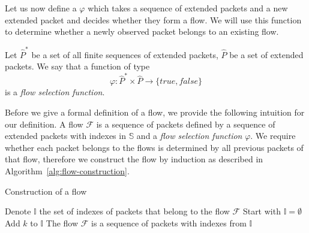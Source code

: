 Let us now define a \emph{} $\varphi$ which takes a sequence of extended packets and a new extended packet and decides whether they form a flow. We will use this function to determine whether a newly observed packet belongs to an existing flow.
\begin{defn}\label{def:flow-selection-function}
Let $\widehat{P}^*$ be a set of all finite sequences of extended packets, $\widehat{P}$ be a set of extended packets. We say that a function of type
\begin{equation*}
 	\varphi: \widehat{P}^*\times \widehat{P} \to \{true,false\}
\end{equation*}
is a \emph{flow selection function}.
\end{defn}

Before we give a formal definition of a flow, we provide the following intuition for our definition. A flow $\mathcal{F}$ is a sequence of packets defined by a sequence of extended packets with indexes in $\mathbb{S}$ and a \emph{flow selection function} $\varphi$. We require whether each packet belongs to the flows is determined by all previous packets of that flow, therefore we construct the flow by induction as described in Algorithm~\ref{alg:flow-construction}.

\begin{algorithm}
    \caption{Construction of a flow}
    \label{alg:flow-construction}
    \begin{algorithmic}[1]
        \STATE Denote $\mathbb{I}$ the set of indexes of packets that belong to the flow $\mathcal{F}$
        \STATE Start with $\mathbb{I} = \emptyset$
			\STATE Add $k$ to $\mathbb{I}$
        \ENDWHILE
        \STATE The flow $\mathcal{F}$ is a sequence of packets with indexes from $\mathbb{I}$
    \end{algorithmic}
\end{algorithm}

